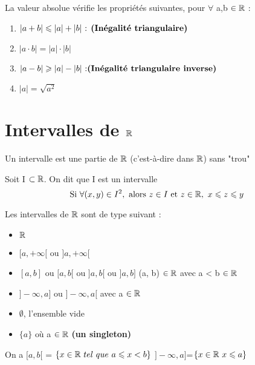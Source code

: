 \begin{graybox}
	\begin{proposition}
		La valeur absolue vérifie les propriétés suivantes, pour $\forall$ a,b $\in \R$ :
		\begin{enumerate}
			\item $|a + b| \leq |a| + |b| \textnormal{ : \textbf{(Inégalité triangulaire)}}$
			\item $|a \cdot b| = |a| \cdot |b|$
			\item $|a - b| \geq |a| - |b| \textnormal{ :\textbf{(Inégalité triangulaire inverse)}}$
			\item $|a|= \sqrt{a^2}$
		\end{enumerate}
	\end{proposition}
\end{graybox}




\section{Intervalles de $\R$}
Un intervalle est une partie de $\R$ (c'est-à-dire dans $\R$) sans "trou"

\begin{graybox}
	\begin{definition}[Intervalle]
		Soit I $\subset \R$. On dit que I est un intervalle 
		$$ \textnormal{Si } \forall (x, y) \in I^2, \textnormal{ alors } z \in I \textnormal{ et } z \in \R,\ x \leq z \leq y $$
	\end{definition}
\end{graybox}

\begin{graybox}
	\begin{proposition}[Intervalles de $\R$]
		Les intervalles de $\R$ sont de type suivant :
		\begin{itemize}
			\item $\R$
			\item $[a,+\infty[$ \textnormal{ou} $]a, +\infty[$
			\item $[a,b]$ \textnormal{ou} $[a,b[$ \textnormal{ou} $]a,b[$ \textnormal{ou} $]a,b]$ \textnormal{(a, b)} $\in \R$  \textnormal{avec a < b} $\in \R$ 
			\item $]-\infty, a]$ \textnormal{ou} $]-\infty , a[$ \textnormal{avec a $\in \R$}
			\item $\emptyset$, \textnormal{l'ensemble vide}
			\item $\{ a \}$ \textnormal{où a} $\in \R$ \textbf{(un singleton)}
		\end{itemize}
		\medskip 
		On a
		\newline
		$[a,b[$ = $\{x \in \R ~ tel ~ que ~ a \leq x < b \}$
		\newline
		$]-\infty, a]$=$\{ x \in \R ~ x \leq a \}$
	\end{proposition}
\end{graybox}


